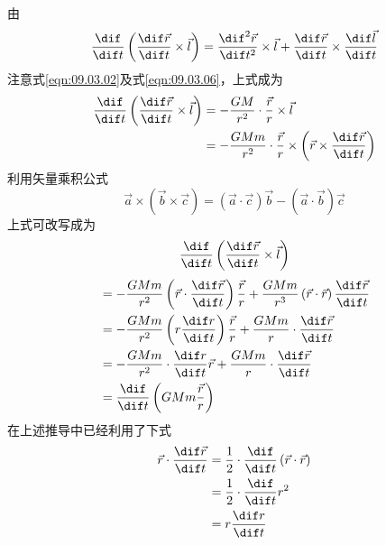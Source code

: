 \documentclass[../outline-of-mechanics.tex]{subfiles}
\begin{document}
由
\begin{equation*}
  \frac { \dif } { \dif t } \left( \frac { \dif \vec{r} } { \dif t } \times \vec{l} \right) = \frac { \dif ^ { 2 } \vec{r} } { \dif t ^ { 2 } } \times \vec{l} + \frac { \dif \vec{r} } { \dif t } \times \frac { \dif \vec{l}} { \dif t }
\end{equation*}
注意式\eqref{eqn:09.03.02}及式\eqref{eqn:09.03.06}，上式成为
\begin{equation*}
  \begin{split}
    \frac { \dif } { \dif t } \left( \frac { \dif \vec{r} } { \dif t } \times \vec{l} \right) &= - \frac { G M } { r ^ { 2 } } \cdot \frac { \vec{r} } { r } \times \vec{l} \\
    &= - \frac { G M m } { r ^ { 2 } } \cdot \frac { \vec{r} } { r } \times \left( \vec{r} \times \frac { \dif \vec{r} } { \dif t } \right)
  \end{split}
\end{equation*}
利用矢量乘积公式
\begin{equation}\label{eqn:09.03.08}
  \vec{a} \times \left( \vec{b} \times \vec{c} \right) = \left( \vec{a} \cdot \vec{c} \right) \vec{b} - \left( \vec{a} \cdot \vec{b} \right) \vec{c}
\end{equation}
上式可改写成为
\begin{equation*}
  \frac { \dif } { \dif t } \left( \frac { \dif \vec{r} } { \dif t } \times \vec{l} \right)
\end{equation*}
\begin{equation}\label{eqn:09.03.09}
  \begin{split}
    &= - \frac { G M m } { r ^ { 2 } } \left( \vec{r} \cdot \frac { \dif \vec{r} } { \dif t } \right) \frac { \vec{r} } { r } + \frac { G M m } { r ^ { 3 } } \left( \vec{r} \cdot \vec{r} \right) \frac { \dif \vec{r} } { \dif t } \\
    &= - \frac { G M m } { r ^ { 2 } } \left( r \frac { \dif r } { \dif t } \right) \frac { \vec{r} } { r } + \frac { G M m } { r } \cdot \frac { \dif \vec{r} } { \dif t } \\
    &= - \frac { G M m } { r ^ { 2 } } \cdot \frac { \dif r } { \dif t } \vec{r} + \frac { G M m } { r } \cdot \frac { \dif \vec{r} } { \dif t } \\
    &= \frac { \dif } { \dif t } \left( G M m \frac { \vec{r} } { r } \right)
  \end{split}
\end{equation}
在上述推导中已经利用了下式
\begin{equation*}
  \begin{split}
    \vec{r} \cdot \frac { \dif \vec{r} } { \dif t } &= \frac { 1 } { 2 } \cdot \frac { \dif } { \dif t } \left( \vec{r} \cdot \vec{r} \right) \\
    &= \frac { 1 } { 2 } \cdot \frac { \dif } { \dif t } r ^ { 2 } \\
    &= r \frac { \dif r } { \dif t }
  \end{split}
\end{equation*}
\end{document}

